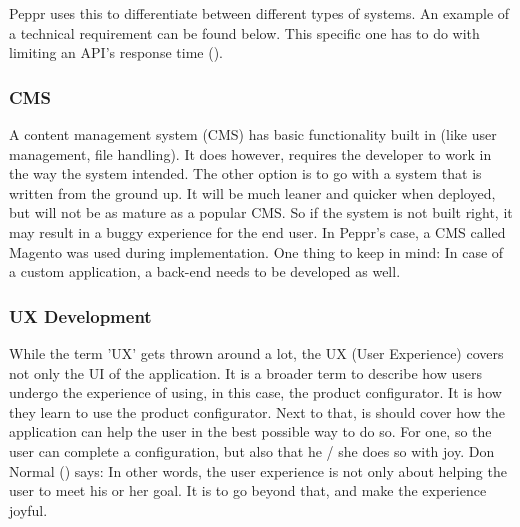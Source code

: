 \newline

Peppr uses this to differentiate between different types of systems. An example of a technical requirement can be found below. This specific one has to do with limiting an API's response time (\cite{responseTimes}).

\newline

\subsubsection{CMS}
A content management system (CMS) has basic functionality built in (like user management, file handling). It does however, requires the developer to work in the way the system intended. The other option is to go with a system that is written from the ground up. It will be much leaner and quicker when deployed, but will not be as mature as a popular CMS. So if the system is not built right, it may result in a buggy experience for the end user. In Peppr's case, a CMS called Magento was used during implementation. One thing to keep in mind: In case of a custom application, a back-end needs to be developed as well.
\subsubsection{UX Development}
While the term 'UX' gets thrown around a lot, the UX (User Experience) covers not only the UI of the application. It is a broader term to describe how users undergo the experience of using, in this case, the product configurator. It is how they learn to use the product configurator. Next to that, is should cover how the application can help the user in the best possible way to do so. For one, so the user can complete a configuration, but also that he / she does so with joy. Don Normal (\cite{userExperience}) says: \newline
{} \newline
In other words, the user experience is not only about helping the user to meet his or her goal. It is to go beyond that, and make the experience joyful.

